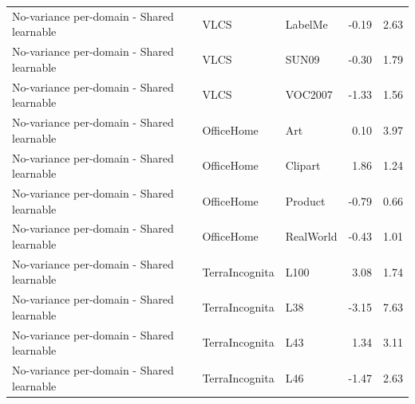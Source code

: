 \begin{tabular}{lllrr}
No-variance per-domain - Shared learnable & VLCS & LabelMe & -0.19 & 2.63 \\
No-variance per-domain - Shared learnable & VLCS & SUN09 & -0.30 & 1.79 \\
No-variance per-domain - Shared learnable & VLCS & VOC2007 & -1.33 & 1.56 \\
No-variance per-domain - Shared learnable & OfficeHome & Art & 0.10 & 3.97 \\
No-variance per-domain - Shared learnable & OfficeHome & Clipart & 1.86 & 1.24 \\
No-variance per-domain - Shared learnable & OfficeHome & Product & -0.79 & 0.66 \\
No-variance per-domain - Shared learnable & OfficeHome & RealWorld & -0.43 & 1.01 \\
No-variance per-domain - Shared learnable & TerraIncognita & L100 & 3.08 & 1.74 \\
No-variance per-domain - Shared learnable & TerraIncognita & L38 & -3.15 & 7.63 \\
No-variance per-domain - Shared learnable & TerraIncognita & L43 & 1.34 & 3.11 \\
No-variance per-domain - Shared learnable & TerraIncognita & L46 & -1.47 & 2.63 \\
\bottomrule
\end{tabular}

